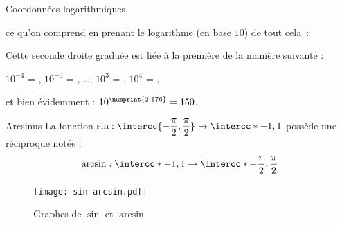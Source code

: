 \begin{frame}[fragile]{Coordonnées logarithmiques.}
\begin{center}
\end{center}
ce qu'on comprend en \og prenant le logarithme (en base $10$) de tout
cela~:\fg{}
\begin{center}
\end{center}
Cette seconde droite graduée est liée à la première de la manière suivante :
\begin{center}
$10^{-4}$ = , $10^{-3}$ = , \dots, $10^{3}$ = , $10^{4}$ = ,
\end{center}
et bien évidemment : $10^{\numprint{2.176}} = 150$.
\end{frame}
\begin{frame}{Arcsinus}
La fonction $\sin : \intercc{-\dfrac{\pi}{2}, \dfrac{\pi}{2}} \to \intercc*{-1,1}$
possède une réciproque notée :
\begin{equation*}
\arcsin : \intercc*{-1,1} \to \intercc*{-\dfrac{\pi}{2},\dfrac{\pi}{2}}
\end{equation*}

\begin{figure}[ht!]
\centering
\texttt{[image: sin-arcsin.pdf]}
\caption{Graphes de $\sin$ et $\arcsin$}
\end{figure}
\end{frame}
\renewcommand{\vec}[1]{\fleche{#1}}%
